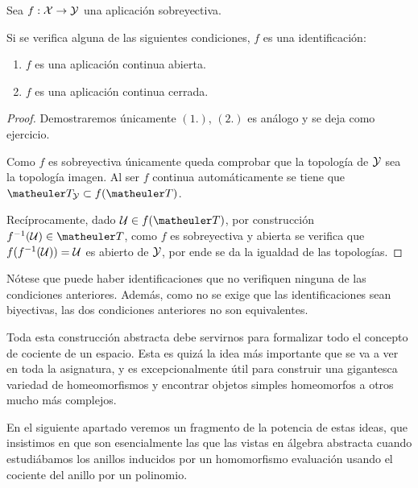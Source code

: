 \begin{prop}
	\label{const_prop_identif}
	Sea $f:\mathcal{X}\to\mathcal{Y}$ una aplicación sobreyectiva.
	
	Si se verifica alguna de las siguientes condiciones, $f$ es una identificación:
	\begin{enumerate}
		\item $f$ es una aplicación continua abierta.
		\item $f$ es una aplicación continua cerrada.
	\end{enumerate}
\end{prop}
\begin{proof}
	Demostraremos únicamente $(1.)$, $(2.)$ es análogo y se deja como ejercicio.
	
	Como $f$ es sobreyectiva únicamente queda comprobar que la topología de $\mathcal{Y}$ sea la topología imagen. Al ser $f$ continua automáticamente se tiene que $\T_\Y\subset f(\T)$.
	
	Recíprocamente, dado $\U\in f(\T)$, por construcción $f^{-1}(\U)\in\T$, como $f$ es sobreyectiva y abierta se verifica que $f(f^{-1}(\mathcal{U}))=\mathcal{U}$ es abierto de $\mathcal{Y}$, por ende se da la igualdad de las topologías.
\end{proof}

Nótese que puede haber identificaciones que no verifiquen ninguna de las condiciones anteriores. Además, como no se exige que las identificaciones sean biyectivas, las dos condiciones anteriores no son equivalentes.

Toda esta construcción abstracta debe servirnos para formalizar todo el concepto de cociente de un espacio. Esta es quizá la idea más importante que se va a ver en toda la asignatura, y es excepcionalmente útil para construir una gigantesca variedad de homeomorfismos y encontrar objetos simples homeomorfos a otros mucho más complejos.

En el siguiente apartado veremos un fragmento de la potencia de estas ideas, que insistimos en que son esencialmente las que las vistas en álgebra abstracta cuando estudiábamos los anillos inducidos por un homomorfismo evaluación usando el cociente del anillo por un polinomio.
